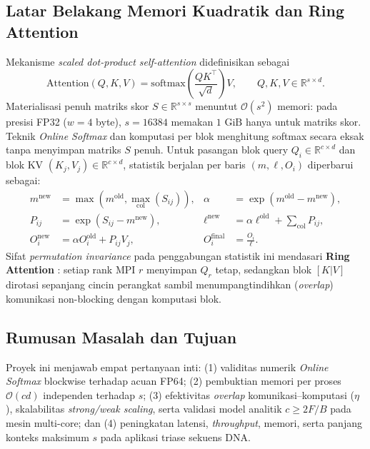 \documentclass[11pt,a4paper]{article}
\begin{document}
\subsection{Latar Belakang Memori Kuadratik dan Ring Attention}
Mekanisme \emph{scaled dot-product self-attention} \cite{vaswani2017} didefinisikan sebagai
\begin{equation}
\mathrm{Attention}(Q, K, V) = \mathrm{softmax}\!\left(\frac{Q K^\top}{\sqrt{d}}\right) V, \qquad Q, K, V \in \mathbb{R}^{s \times d}.
\end{equation}
Materialisasi penuh matriks skor $S \in \mathbb{R}^{s \times s}$ menuntut $\mathcal{O}(s^2)$ memori: pada presisi FP32 ($w=4$ byte), $s=16384$ memakan $1\text{ GiB}$ hanya untuk matriks skor. Teknik \emph{Online Softmax} \cite{milakov2018} dan komputasi per blok \cite{dao2022,liu2023bpt} menghitung softmax secara eksak tanpa menyimpan matriks $S$ penuh. Untuk pasangan blok query $Q_i \in \mathbb{R}^{c \times d}$ dan blok KV $(K_j, V_j) \in \mathbb{R}^{c \times d}$, statistik berjalan per baris $(m, \ell, O_i)$ diperbarui sebagai:
\begin{align}
m^{\mathrm{new}} &= \max\!\left(m^{\mathrm{old}}, \max_{\mathrm{col}}(S_{ij})\right), &
\alpha &= \exp\!\left(m^{\mathrm{old}} - m^{\mathrm{new}}\right), \\
P_{ij} &= \exp\!\left(S_{ij} - m^{\mathrm{new}}\right), &
\ell^{\mathrm{new}} &= \alpha \ell^{\mathrm{old}} + \sum_{\mathrm{col}} P_{ij}, \\
O_i^{\mathrm{new}} &= \alpha O_i^{\mathrm{old}} + P_{ij} V_j, &
O_i^{\mathrm{final}} &= \frac{O_i}{\ell}.
\end{align}
Sifat \emph{permutation invariance} pada penggabungan statistik ini mendasari \textbf{Ring Attention} \cite{liu2023ring}: setiap rank MPI $r$ menyimpan $Q_r$ tetap, sedangkan blok $[K|V]$ dirotasi sepanjang cincin perangkat sambil menumpangtindihkan (\emph{overlap}) komunikasi non-blocking dengan komputasi blok.

\subsection{Rumusan Masalah dan Tujuan}
Proyek ini menjawab empat pertanyaan inti: (1) validitas numerik \emph{Online Softmax} blockwise terhadap acuan FP64; (2) pembuktian memori per proses $\mathcal{O}(cd)$ independen terhadap $s$; (3) efektivitas \emph{overlap} komunikasi--komputasi ($\eta$), skalabilitas \emph{strong/weak scaling}, serta validasi model analitik $c \ge 2F/B$ pada mesin multi-core; dan (4) peningkatan latensi, \emph{throughput}, memori, serta panjang konteks maksimum $s$ pada aplikasi triase sekuens DNA.
\end{document}
